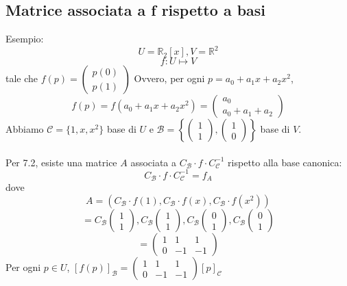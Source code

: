 \documentclass[12pt]{article}
\begin{document}
\subsection{Matrice associata a f rispetto a basi}
Esempio:
\[U = \mathbb{R}_2[x], V = \mathbb{R}^2\]
\[f: U \mapsto V\]
tale che $f(p) = \begin{pmatrix}
    p(0)\\
    p(1)
\end{pmatrix}$
Ovvero, per ogni $p = a_0 + a_1x + a_2x^2$,
\[f(p) = f(a_0 + a_1x + a_2x^2) = \begin{pmatrix}
    a_0\\
    a_0 + a_1 + a_2
\end{pmatrix}\]
Abbiamo $\mathcal{C} = \{1, x, x^2\}$ base di $U$ e $\mathcal{B} = \left\{\begin{pmatrix}
    1\\
    1
\end{pmatrix}, \begin{pmatrix}
    1\\
    0
\end{pmatrix}\right\}$ base di $V$.
\\\\
Per 7.2, esiste una matrice $A$ associata a $C_{\mathcal{B}} \cdot f \cdot C_{\mathcal{C}}^{-1}$ rispetto alla base canonica:
\[C_{\mathcal{B}} \cdot f \cdot C_{\mathcal{C}}^{-1} = f_A\]
dove
\[A = (C_{\mathcal{B}} \cdot f(1), C_{\mathcal{B}} \cdot f(x), C_{\mathcal{B}} \cdot f(x^2))\]
\[=  C_{\mathcal{B}}\begin{pmatrix}
   1\\
   1
\end{pmatrix}, C_{\mathcal{B}}\begin{pmatrix}
   1\\
   1
\end{pmatrix}, C_{\mathcal{B}}\begin{pmatrix}
   0\\
   1
\end{pmatrix}, C_{\mathcal{B}}\begin{pmatrix}
    0\\
    1
\end{pmatrix}\]
\[= \begin{pmatrix}
    1 & 1 & 1\\
    0 & -1 & -1
\end{pmatrix}\]
Per ogni $p \in U$, $[f(p)]_{\mathcal{B}} = \begin{pmatrix}
    1 & 1 & 1\\
    0 & -1 & -1
\end{pmatrix}[p]_{\mathcal{C}}$
\end{document}
